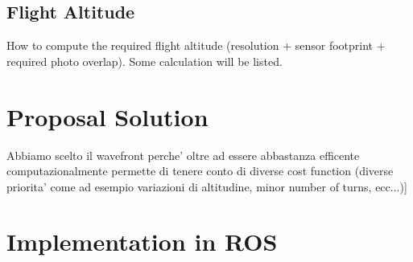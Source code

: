 \subsection{Flight Altitude} %
\label{sub:flight_altitude}
How to compute the required flight altitude (resolution + sensor footprint + required photo overlap). Some calculation will be listed.



\section{Proposal Solution} %
\label{sec:proposal_solution}

Abbiamo scelto il wavefront perche' oltre ad essere abbastanza efficente computazionalmente permette di tenere conto di diverse cost function (diverse priorita' come ad esempio variazioni di altitudine, minor number of turns, ecc...)]


\section{Implementation in ROS} %
\label{sec:implementation_in_ros}


